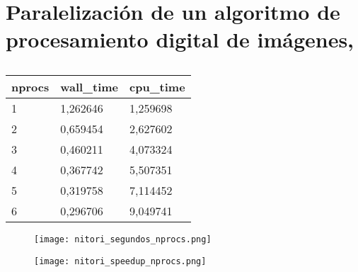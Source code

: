 \section{Paralelización de un algoritmo de procesamiento digital de imágenes,}

\begin{table}[!ht]
    \centering
    \begin{tabular}{|l|l|l|}
    \hline
        \textbf{nprocs} & \textbf{wall\_time} & \textbf{cpu\_time} \\ \hline
        1 & 1,262646 & 1,259698 \\ \hline
        2 & 0,659454 & 2,627602 \\ \hline
        3 & 0,460211 & 4,073324 \\ \hline
        4 & 0,367742 & 5,507351 \\ \hline
        5 & 0,319758 & 7,114452 \\ \hline
        6 & 0,296706 & 9,049741 \\ \hline
    \end{tabular}
    \caption{}
\end{table}

\begin{figure}[ht]
    \centering
    \texttt{[image: nitori\_segundos\_nprocs.png]}
    \caption{}
\end{figure}

\begin{figure}[ht]
    \centering
    \texttt{[image: nitori\_speedup\_nprocs.png]}
    \caption{}
\end{figure}
